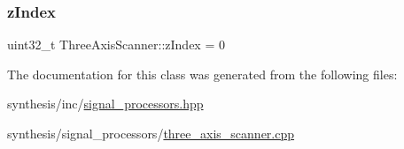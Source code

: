 \mbox{\label{class_three_axis_scanner_a1e0deccb90209b32e5f8a837137a3aec}} 
\subsubsection{\texorpdfstring{z\+Index}{zIndex}}
{\footnotesize\ttfamily uint32\+\_\+t Three\+Axis\+Scanner\+::z\+Index = 0}



The documentation for this class was generated from the following files\+:\begin{DoxyCompactItemize}
\item 
synthesis/inc/\mbox{\hyperlink{signal__processors_8hpp}{signal\+\_\+processors.\+hpp}}\item 
synthesis/signal\+\_\+processors/\mbox{\hyperlink{three__axis__scanner_8cpp}{three\+\_\+axis\+\_\+scanner.\+cpp}}\end{DoxyCompactItemize}
